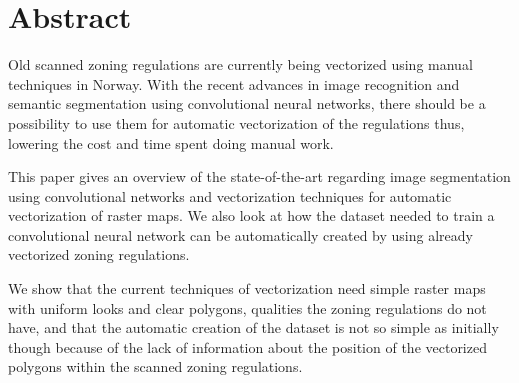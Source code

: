 \section*{Abstract}
Old scanned zoning regulations are currently being vectorized using manual techniques in Norway. With the recent advances in image recognition and semantic segmentation using convolutional neural networks, there should be a possibility to use them for automatic vectorization of the regulations thus, lowering the cost and time spent doing manual work.

This paper gives an overview of the state-of-the-art regarding image segmentation using convolutional networks and vectorization techniques for automatic vectorization of raster maps. We also look at how the dataset needed to train a convolutional neural network can be automatically created by using already vectorized zoning regulations.

We show that the current techniques of vectorization need simple raster maps with uniform looks and clear polygons, qualities the zoning regulations do not have, and that the automatic creation of the dataset is not so simple as initially though because of the lack of information about the position of the vectorized polygons within the scanned zoning regulations.